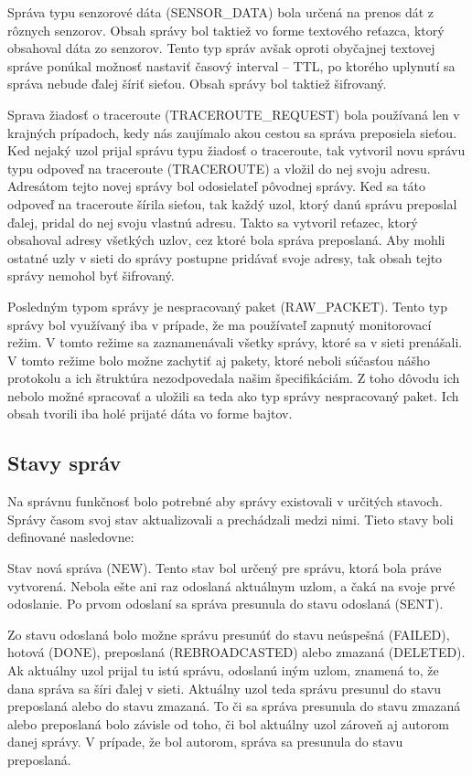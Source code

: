 \documentclass[slovak,master]{diploma}
\begin{document}
Správa typu senzorové dáta (SENSOR\_DATA) bola určená na prenos dát z rôznych senzorov. Obsah správy bol taktiež vo forme textového 
reťazca, ktorý obsahoval dáta zo senzorov. Tento typ správ avšak oproti obyčajnej textovej správe ponúkal možnosť nastaviť 
časový interval -- TTL, po ktorého uplynutí sa správa nebude ďalej šíriť sieťou. Obsah správy bol taktiež šifrovaný.

Sprava žiadosť o traceroute (TRACEROUTE\_REQUEST) bola používaná len v krajných prípadoch, kedy nás zaujímalo akou cestou sa správa preposiela sieťou. 
Ked nejaký uzol prijal správu typu žiadosť o traceroute, tak vytvoril novu správu typu odpoveď na traceroute (TRACEROUTE) a vložil do nej svoju adresu. 
Adresátom tejto novej správy bol odosielateľ pôvodnej správy. Ked sa táto odpoveď na traceroute šírila sieťou, 
tak každý uzol, ktorý danú správu preposlal ďalej, pridal do nej svoju vlastnú adresu.
Takto sa vytvoril reťazec, ktorý obsahoval adresy všetkých uzlov, cez ktoré bola správa preposlaná.
Aby mohli ostatné uzly v sieti do správy postupne pridávať svoje adresy, tak obsah tejto správy nemohol byť šifrovaný.

Posledným typom správy je nespracovaný paket (RAW\_PACKET). Tento typ správy bol využívaný iba v prípade, že ma používateľ zapnutý monitorovací režim.
V tomto režime sa zaznamenávali všetky správy, ktoré sa v sieti prenášali. V tomto režime bolo možne zachytiť aj pakety, 
ktoré neboli súčasťou nášho protokolu a ich štruktúra nezodpovedala našim špecifikáciám. Z toho dôvodu ich nebolo možné spracovať a 
uložili sa teda ako typ správy nespracovaný paket. Ich obsah tvorili iba holé prijaté dáta vo forme bajtov.

\subsection{Stavy správ}
Na správnu funkčnosť bolo potrebné aby správy existovali v určitých stavoch. Správy časom svoj stav aktualizovali a prechádzali medzi nimi. 
Tieto stavy boli definované nasledovne:

Stav nová správa (NEW). Tento stav bol určený pre správu, ktorá bola práve vytvorená. Nebola ešte ani raz odoslaná aktuálnym uzlom, a čaká na svoje 
prvé odoslanie. Po prvom odoslaní sa správa presunula do stavu odoslaná (SENT).

Zo stavu odoslaná bolo možne správu presunúť do stavu neúspešná (FAILED), hotová (DONE), preposlaná (REBROADCASTED) alebo zmazaná (DELETED). 
Ak aktuálny uzol prijal tu istú správu, odoslanú iným uzlom, znamená to, že dana správa sa šíri ďalej v sieti. Aktuálny uzol teda správu 
presunul do stavu preposlaná alebo do stavu zmazaná. 
To či sa správa presunula do stavu zmazaná alebo preposlaná bolo závisle od toho, či bol aktuálny uzol zároveň aj autorom danej správy. V prípade, že bol autorom, 
správa sa presunula do stavu preposlaná.
\end{document}
